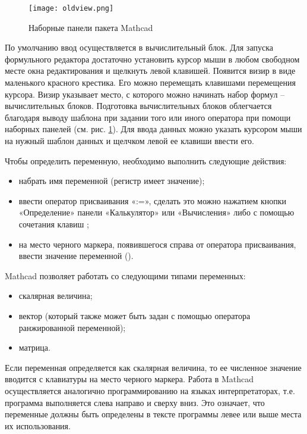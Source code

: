 \begin{figure}[h]
	\begin{center}
		\texttt{[image: oldview.png]}
	\end{center}
	\caption{Наборные панели пакета Mathcad} \label{fig:oldmathcad.view}
\end{figure}

По умолчанию ввод осуществляется в вычислительный блок. Для запуска формульного редактора достаточно установить курсор мыши в любом свободном месте окна редактирования и щелкнуть левой клавишей. Появится визир в виде маленького красного крестика. Его можно перемещать клавишами перемещения курсора. Визир указывает место, с которого можно начинать набор формул – вычислительных блоков. Подготовка вычислительных блоков облегчается благодаря выводу шаблона при задании того или иного оператора при помощи наборных панелей (см. рис. \ref{fig:oldmathcad.view}). Для ввода данных можно указать курсором мыши на нужный шаблон данных и щелчком левой ее клавиши ввести его.

Чтобы определить переменную, необходимо выполнить следующие действия:
\begin{itemize}
	\item набрать имя переменной (регистр имеет значение);
	\item ввести оператор присваивания «:=», сделать это можно нажатием кнопки «Определение» панели «Калькулятор» или «Вычисления» либо с помощью сочетания клавиш \keys{\shift+:};
	\item на место черного маркера, появившегося справа от оператора присваивания, ввести значение переменной ().
\end{itemize}
Mathcad позволяет работать со следующими типами переменных:
\begin{itemize}
\item скалярная величина;
\item вектор (который также может быть задан с помощью оператора ранжированной переменной);
\item матрица.
\end{itemize}

Если переменная определяется как скалярная величина, то ее численное значение вводится с клавиатуры на место черного маркера. Работа в Mathcad осуществляется аналогично программированию на языках интерпретаторах, т.е. программа выполняется слева направо и сверху вниз. Это означает, что переменные должны быть определены в тексте программы левее или выше места их использования.

